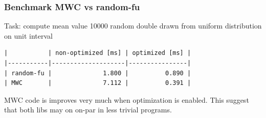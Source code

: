 \documentclass[mathserif, 8pt, handout]{beamer}
\begin{document}
\begin{frame}[standout]
\end{frame}

\begin{frame}[fragile]
  \frametitle{Benchmark MWC vs random-fu}
Task: compute mean value 10000 random double drawn from uniform distribution on
unit interval

\begin{verbatim}
|           | non-optimized [ms] | optimized [ms] |
|-----------|--------------------|----------------|
| random-fu |              1.800 |          0.890 |
| MWC       |              7.112 |          0.391 |
\end{verbatim}

MWC code is improves very much when optimization is
enabled. This suggest that both libs may on on-par
in less trivial programs.
\end{frame}
\end{document}
